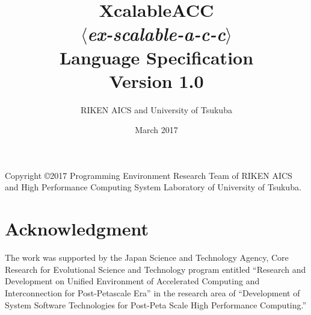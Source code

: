 \documentclass[a4paper,11pt,twoside]{report}
\title{{\Huge XcalableACC}\\
$\langle${\it ex-scalable-a-c-c}$\rangle$\\
Language Specification\\
\vspace{2cm}
Version 1.0\\}
\author{
\Large RIKEN AICS and University of Tsukuba\\
}
\date{\vspace{4cm}\Large March 2017}
\def\XMP{XcalableMP}
\begin{document}
\maketitle

Copyright \copyright 2017 Programming Environment Research Team of RIKEN AICS
and High Performance Computing System Laboratory of University of Tsukuba.

\clearpage

\cleardoublepage

\tableofcontents

\newpage
\mbox{}\newpage

\pagestyle{fancy}
\fancyhead{} %
\fancyhead[RE]{\leftmark}
\fancyhead[LO]{\rightmark}
\fancyhead[LE,RO]{\thepage}
\fancyfoot{} %
\renewcommand{\headrulewidth}{0pt}
\renewcommand{\footrulewidth}{0pt}

 \cleardoublepage
 \cleardoublepage
 \cleardoublepage
%

\cleardoublepage
\chapter*{Acknowledgment}

The work was supported by the Japan Science and Technology Agency, 
Core Research for Evolutional Science and Technology program entitled 
``Research and Development on Unified Environment of Accelerated Computing and Interconnection for Post-Petascale Era'' 
in the research area of ``Development of System Software Technologies for Post-Peta Scale High Performance Computing.''
\end{document}
